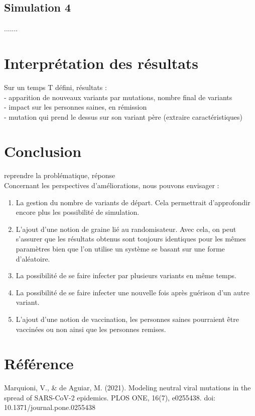 \documentclass{article}
\begin{document}
\subsection{Simulation 4}
.......

\section{Interprétation des résultats}

Sur un temps T défini, résultats :\\
- apparition de nouveaux variants par mutations, nombre final de variants\\
- impact sur les personnes saines, en rémission\\
- mutation qui prend le dessus sur son variant père (extraire caractéristiques)\\

\section{Conclusion}

reprendre la problématique, réponse\\

Concernant les perspectives d'améliorations, nous pouvons envisager :\\
\begin{enumerate}
    \item La gestion du nombre de variants de départ. Cela permettrait d'approfondir encore plus les possibilité de simulation. \\
    \item L'ajout d'une notion de graine lié au randomisateur. Avec cela, on peut s'assurer que les résultats obtenus sont toujours identiques pour les mêmes paramètres bien que l'on utilise un système se basant sur une forme d'aléatoire. \\
    \item La possibilité de se faire infecter par plusieurs variants en même temps. \\
    \item La possibilité de se faire infecter une nouvelle fois après guérison d'un autre variant. \\
    \item L'ajout d'une notion de vaccination, les personnes saines pourraient être vaccinées ou non ainsi que les personnes remises. \\
\end{enumerate}

\section{Référence}

Marquioni, V., & de Aguiar, M. (2021). Modeling neutral viral mutations in the spread of SARS-CoV-2 epidemics. PLOS ONE, 16(7), e0255438. doi: 10.1371/journal.pone.0255438
\end{document}
